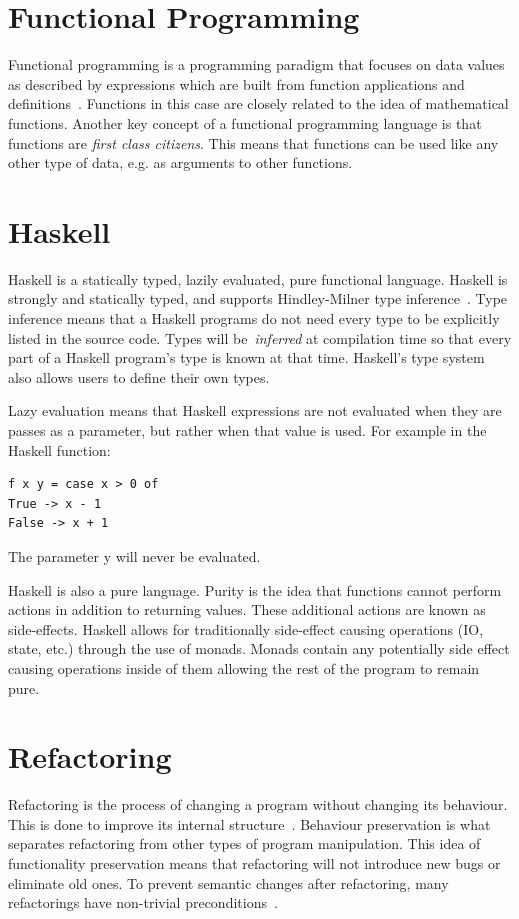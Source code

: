 \section{Functional Programming}
Functional programming is a programming paradigm that focuses on data values as described by expressions which are built from function applications and definitions~\citep{elementsOfFunc}.  Functions in this case are closely related to the idea of mathematical functions. Another key concept of a functional programming language is that functions are \textit{first class citizens}. This means that functions can be used like any other type of data, e.g. as arguments to other functions. 
  
\section{Haskell}
Haskell is a statically typed, lazily evaluated, pure functional language. Haskell is strongly and statically typed, and supports Hindley-Milner type inference~\citep{wikiIntro}. Type inference means that a Haskell programs do not need every type to be explicitly listed in the source code. Types will be~\textit{inferred} at compilation time so that every part of a Haskell program's type is known at that time. Haskell's type system also allows users to define their own types.

Lazy evaluation means that Haskell expressions are not evaluated when they are passes as a parameter, but rather when that value is used. For example in the Haskell function:
\clearpage
\begin{verbatim}
f x y = case x > 0 of
True -> x - 1
False -> x + 1
\end{verbatim}

The parameter y will never be evaluated.

Haskell is also a pure language. Purity is the idea that functions cannot perform actions in addition to returning values. These additional actions are known as side-effects. Haskell allows for traditionally side-effect causing operations (IO, state, etc.) through the use of monads. Monads contain any potentially side effect causing operations inside of them allowing the rest of the program to remain pure.

\section{Refactoring} 
Refactoring is the process of changing a program without changing its behaviour. This is done to improve its internal structure~\citep{fowler}. Behaviour preservation is what separates refactoring from other types of program manipulation. This idea of functionality preservation means that refactoring will not introduce new bugs or eliminate old ones. To prevent semantic changes after refactoring, many refactorings have non-trivial preconditions~\citep{refacTools}. 

